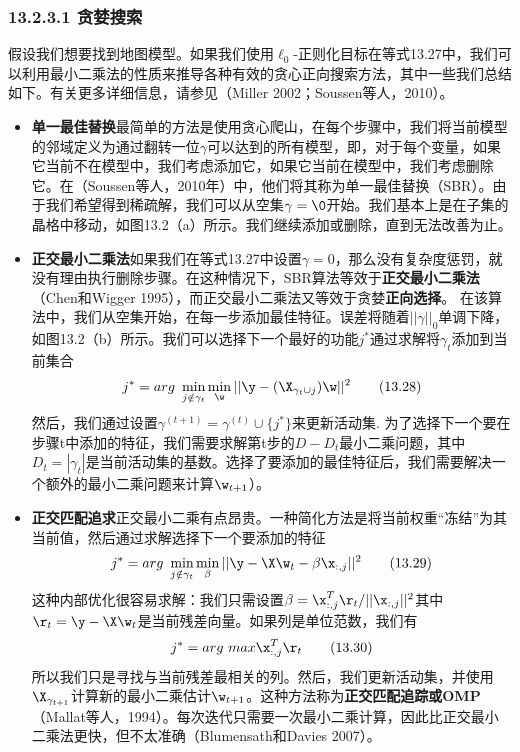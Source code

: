 \documentclass[a4paper]{article}
\begin{document}
\subsubsection*{13.2.3.1 贪婪搜索 }
假设我们想要找到地图模型。如果我们使用$\ell_0$-正则化目标在等式13.27中，我们可以利用最小二乘法的性质来推导各种有效的贪心正向搜索方法，其中一些我们总结如下。有关更多详细信息，请参见（Miller 2002；Soussen等人，2010）。 
\begin{itemize}
\item \textbf{单一最佳替换}最简单的方法是使用贪心爬山，在每个步骤中，我们将当前模型的邻域定义为通过翻转一位$\gamma$可以达到的所有模型，即，对于每个变量，如果它当前不在模型中，我们考虑添加它，如果它当前在模型中，我们考虑删除它。在（Soussen等人，2010年）中，他们将其称为单一最佳替换（SBR）。由于我们希望得到稀疏解，我们可以从空集$\gamma=\0$开始。我们基本上是在子集的晶格中移动，如图13.2（a）所示。我们继续添加或删除，直到无法改善为止。 
\item \textbf{正交最小二乘法}如果我们在等式13.27中设置$\gamma=0$，那么没有复杂度惩罚，就没有理由执行删除步骤。在这种情况下，SBR算法等效于\textbf{正交最小二乘法}（Chen和Wigger 1995），而正交最小二乘法又等效于贪婪\textbf{正向选择}。 在该算法中，我们从空集开始，在每一步添加最佳特征。误差将随着$||\gamma||_0$单调下降，如图13.2（b）所示。我们可以选择下一个最好的功能$j^*$通过求解将$\gamma_t$添加到当前集合
\begin{equation}
	j^*=arg\ \min_{j\notin \gamma_t}\min_\w||\y-(\X_{\gamma_t\cup j})\w||^2\tag{13.28}
\end{equation}
然后，我们通过设置$\gamma^{(t+1)}=\gamma^{(t)}\cup \{j^*\}$来更新活动集. 为了选择下一个要在步骤t中添加的特征，我们需要求解第t步的$D-D_t$最小二乘问题，其中$D_t=|\gamma_t|$是当前活动集的基数。选择了要添加的最佳特征后，我们需要解决一个额外的最小二乘问题来计算$\w_{t+1}$）。 
\item \textbf{正交匹配追求}正交最小二乘有点昂贵。一种简化方法是将当前权重“冻结”为其当前值，然后通过求解选择下一个要添加的特征 
\begin{equation}
	j^*=arg\ \min_{j\notin \gamma_t}\min_\beta||\y-\X\w_t-\beta\x_{:,j}||^2\tag{13.29}
\end{equation}
这种内部优化很容易求解：我们只需设置$\beta =\x_{:,j}^T\r_t/||\x_{:,j}||^2$其中$\r_t=\y-\X\w_t$是当前残差向量。如果列是单位范数，我们有 
\begin{equation}
	j^*=arg\ max\x_{:,j}^T\r_t\tag{13.30}
\end{equation}
所以我们只是寻找与当前残差最相关的列。然后，我们更新活动集，并使用$\X_{\gamma_{t+1}}$计算新的最小二乘估计$\w_{t+1}$。这种方法称为\textbf{正交匹配追踪或OMP}（Mallat等人，1994）。每次迭代只需要一次最小二乘计算，因此比正交最小二乘法更快，但不太准确（Blumensath和Davies 2007）。

\end{itemize}
\end{document}
